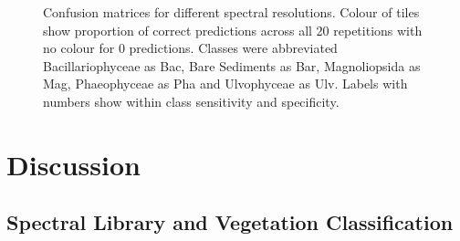 \documentclass[
  letterpaper,
  11pt,
  english,
  singlespacing,
  headsepline]{MastersDoctoralThesis}
\begin{document}
\begin{spacing}{1.5}
\begin{figure}


\caption{\label{fig-ConfMatFIG}Confusion matrices for different spectral
resolutions. Colour of tiles show proportion of correct predictions
across all 20 repetitions with no colour for 0 predictions. Classes were
abbreviated Bacillariophyceae as Bac, Bare Sediments as Bar,
Magnoliopsida as Mag, Phaeophyceae as Pha and Ulvophyceae as Ulv. Labels
with numbers show within class sensitivity and specificity.}

\end{figure}%

\section{Discussion}\label{discussion}

\subsection{Spectral Library and Vegetation
Classification}\label{spectral-library-and-vegetation-classification}


\end{spacing}
\end{document}
